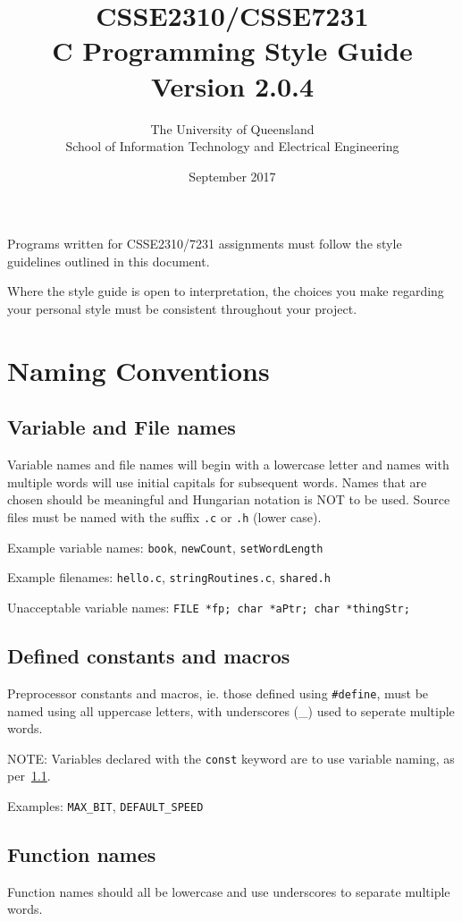 \documentclass{article}
\title{CSSE2310/CSSE7231\\C Programming Style Guide\\Version 2.0.4}
\author{The University of Queensland\\School of Information Technology and Electrical Engineering}
\date{September 2017}
\begin{document}
\maketitle

Programs written for CSSE2310/7231 assignments must follow the style guidelines outlined in this document.

Where the style guide is open to interpretation, the choices you make regarding your personal style must be consistent throughout your project.

\section{Naming Conventions}
\subsection{Variable and File names}
\label{sec:naming-variable}
Variable names and file names will begin with a lowercase letter and names with multiple words will use initial capitals for subsequent words.
Names that are chosen should be meaningful and Hungarian notation is NOT to be used.
Source files must be named with the suffix \texttt{.c} or \texttt{.h} (lower case).

Example variable names: \texttt{book}, \texttt{newCount}, \texttt{setWordLength}

Example filenames: \texttt{hello.c}, \texttt{stringRoutines.c}, \texttt{shared.h}

Unacceptable variable names: \texttt{FILE *fp; char *aPtr; char *thingStr;}

\subsection{Defined constants and macros}
\label{sec:naming-constants}
Preprocessor constants and macros, ie. those defined using \texttt{\#define}, must be named using all uppercase letters, with underscores (\_) used to seperate multiple words.

NOTE: Variables declared with the \texttt{const} keyword are to use variable naming, as per~\ref{sec:naming-variable}.

Examples: \texttt{MAX\_BIT}, \texttt{DEFAULT\_SPEED}

\subsection{Function names}
Function names should all be lowercase and use underscores to separate multiple words.
\end{document}
